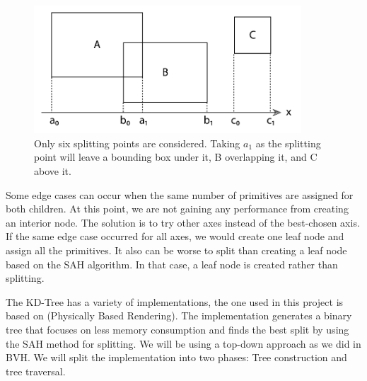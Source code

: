\documentclass[11pt,a4paper]{article}
\begin{document}
\begin{figure}[H]	
     \centering
         \includegraphics[width=10cm]{images/kdtree/projected_bboxes.png}
        \caption{Only six splitting points are considered. Taking $a_1$ as the splitting point will leave a bounding box under it, B overlapping it, and C above it. \protect\cite{Pharr2016}}
        \label{fig:dice}
\end{figure}

Some edge cases can occur when the same number of primitives are assigned for both children. At this point, we are not gaining any performance from creating an interior node. The solution is to try other axes instead of the best-chosen axis. If the same edge case occurred for all axes, we would create one leaf node and assign all the primitives. It also can be worse to split than creating a leaf node based on the SAH algorithm. In that case, a leaf node is created rather than splitting. 



The KD-Tree has a variety of implementations, the one used in this project is based on (Physically Based Rendering). The implementation generates a binary tree that focuses on less memory consumption and finds the best split by using the SAH method for splitting. We will be using a top-down approach as we did in BVH. We will split the implementation into two phases: Tree construction and tree traversal.
\end{document}
